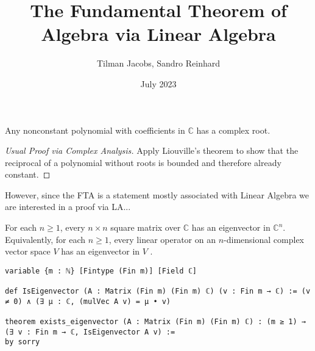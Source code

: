\documentclass{beamer}
\title{The Fundamental Theorem of Algebra via Linear Algebra}
\subtitle{}
\date{July 2023}
\author{Tilman Jacobs, Sandro Reinhard}
\institute{Seminar on Computer Assisted Mathemathics}
\begin{document}
\maketitle

\begin{frame}
    \begin{Theorem}
              Any nonconstant polynomial with coefficients in $\mathbb{C}$ has a complex root.
    \end{Theorem}
  \begin{proof}[Usual Proof via Complex Analysis]
      Apply Liouville's theorem to show that the reciprocal of a polynomial without roots is bounded and therefore already constant.
  \end{proof}
  However, since the FTA is a statement mostly associated with Linear Algebra we are interested in a proof via LA...
\end{frame}


\begin{frame}[fragile]
    \begin{theorem}
        For each $n \geq 1$, every $n \times n$ square matrix over $\mathbb{C}$ has an eigenvector in $\mathbb{C}^n$. Equivalently, for each $n \geq 1$, every linear operator on an $n$-dimensional complex vector space $V$ has an eigenvector in $V$ .
    \end{theorem}
    \hfill
        \begin{lstlisting}
variable {m : ℕ} [Fintype (Fin m)] [Field ℂ]

def IsEigenvector (A : Matrix (Fin m) (Fin m) ℂ) (v : Fin m → ℂ) := (v ≠ 0) ∧ (∃ μ : ℂ, (mulVec A v) = μ • v)

theorem exists_eigenvector (A : Matrix (Fin m) (Fin m) ℂ) : (m ≥ 1) → (∃ v : Fin m → ℂ, IsEigenvector A v) :=
by sorry


    \end{lstlisting}
\end{frame}
\end{document}
